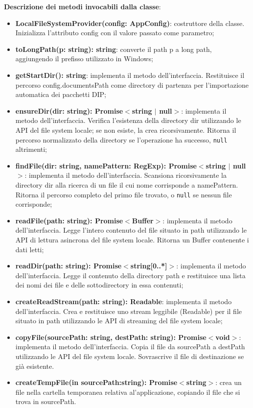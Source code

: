 \documentclass[a4paper,12pt]{article}
\begin{document}
{{{                \noindent \textbf{Descrizione dei metodi invocabili dalla classe}:
                \begin{itemize}
                    \item \textbf{LocalFileSystemProvider(config: AppConfig)}: costruttore della classe. Inizializza l'attributo config con il valore passato come parametro;
                    \item \textbf{toLongPath(p: string): string}: converte il path p a long path, aggiungendo il prefisso utilizzato in Windows; 
                    \item \textbf{getStartDir(): string}: implementa il metodo dell'interfaccia. Restituisce il percorso config.documentsPath come directory di partenza per l'importazione automatica dei pacchetti DIP;
                    \item \textbf{ensureDir(dir: string): Promise$<$string $|$ null$>$}: implementa il metodo dell'interfaccia. Verifica l'esistenza della directory dir utilizzando le API del file system locale; se non esiste, la crea ricorsivamente. Ritorna il percorso normalizzato della directory se l'operazione ha successo, \texttt{null} altrimenti;
                    \item \textbf{findFile(dir: string, namePattern: RegExp): Promise$<$string $|$ null$>$}: implementa il metodo dell'interfaccia. Scansiona ricorsivamente la directory dir alla ricerca di un file il cui nome corrisponde a namePattern. Ritorna il percorso completo del primo file trovato, o \texttt{null} se nessun file corrisponde;
                    \item \textbf{readFile(path: string): Promise$<$Buffer$>$}: implementa il metodo dell'interfaccia. Legge l'intero contenuto del file situato in path utilizzando le API di lettura asincrona del file system locale. Ritorna un Buffer contenente i dati letti;
                    \item \textbf{readDir(path: string): Promise$<$string[0..*]$>$}: implementa il metodo dell'interfaccia. Legge il contenuto della directory path e restituisce una lista dei nomi dei file e delle sottodirectory in essa contenuti;
                    \item \textbf{createReadStream(path: string): Readable}: implementa il metodo dell'interfaccia. Crea e restituisce uno stream leggibile (Readable) per il file situato in path utilizzando le API di streaming del file system locale;
                    \item \textbf{copyFile(sourcePath: string, destPath: string): Promise$<$void$>$}: implementa il metodo dell'interfaccia. Copia il file da sourcePath a destPath utilizzando le API del file system locale. Sovrascrive il file di destinazione se già esistente.
                    \item \textbf{createTempFile(in sourcePath:string): Promise$<$string$>$}: crea un file nella cartella temporanea relativa al'applicazione, copiando il file che si trova in sourcePath.
                \end{itemize}
}}}
\end{document}
